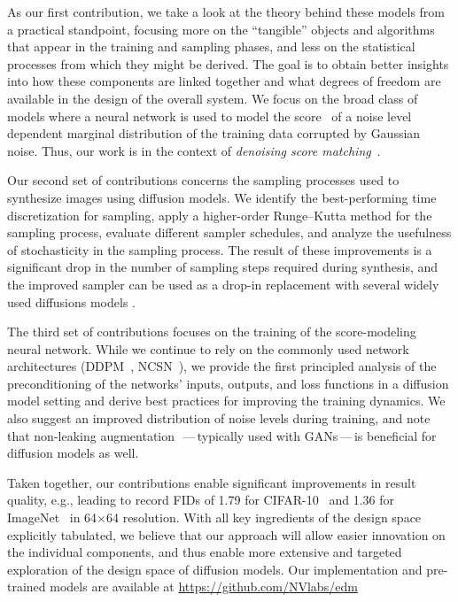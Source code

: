 \documentclass{article}
\begin{document}
As our first contribution, we take a look at the theory behind these models from a practical standpoint, focusing more on the ``tangible'' objects and algorithms that appear in the training and sampling phases, and less on the statistical processes from which they might be derived.
The goal is to obtain better insights into how these components are linked together and what degrees of freedom are available in the design of the overall system.
We focus on the broad class of models where a neural network is used to model the score~\cite{Hyvarinen05} of a noise level dependent marginal distribution of the training data corrupted by Gaussian noise.
Thus, our work is in the context of \emph{denoising score matching}~\cite{Vincent11}.

Our second set of contributions concerns the sampling processes used to synthesize images using diffusion models.
We identify the best-performing time discretization for sampling, apply a higher-order Runge--Kutta method for the sampling process, evaluate different sampler schedules, and analyze the usefulness of stochasticity in the sampling process.
The result of these improvements is a significant drop in the number of sampling steps required during synthesis, and the improved sampler can be used as a drop-in replacement with several widely used diffusions models \cite{Nichol2021a,Song2021sde}.

The third set of contributions focuses on the training of the score-modeling neural network.
While we continue to rely on the commonly used network architectures (DDPM~\cite{Ho2020}, NCSN~\cite{Song2019gradients}), we provide the first principled analysis of the preconditioning of the networks' inputs, outputs, and loss functions in a diffusion model setting and derive best practices for improving the training dynamics.
We also suggest an improved distribution of noise levels during training, and note that non-leaking augmentation~\cite{Karras2020ada}\,---\,typically used with GANs\,---\,is beneficial for diffusion models as well.

Taken together, our contributions enable significant improvements in result quality, e.g., leading to record FID{s} of 1.79 for CIFAR-10~\cite{Krizhevsky2009cifar} {and 1.36 for ImageNet~\cite{Deng2009imagenet} in 64$\times$64 resolution}.
With all key ingredients of the design space explicitly tabulated, we believe that our approach will allow easier innovation on the individual components, and thus enable more extensive and targeted exploration of the design space of diffusion models.
{Our implementation and pre-trained models are available at \url{https://github.com/NVlabs/edm}}
\end{document}
